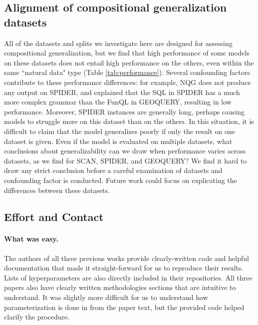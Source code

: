 \subsection{Alignment of compositional generalization datasets}
All of the datasets and splits we investigate here are designed for assessing compositional generalization, but we find that high performance of some models on these datasets does not entail high performance on the others, even within the same ``natural data" type (Table \ref{tab:performance}).
Several confounding factors contribute to these performance differences: for example, NQG does not produce any output on SPIDER, and \cite{shaw-etal-2021-compositional} explained that the SQL in SPIDER has a much more complex grammar than the FunQL in GEOQUERY, resulting in low performance. 
Moreover, SPIDER instances are generally long, perhaps causing models to struggle more on this dataset than on the others.
In this situation, it is difficult to claim that the model generalizes poorly if only the result on one dataset is given.
Even if the model is evaluated on multiple datasets, what conclusions about generalizability can we draw when performance varies across datasets, as we find for SCAN, SPIDER, and GEOQUERY?
We find it hard to draw any strict conclusion before a careful examination of datasets and confounding factor is conducted. Future work could focus on explicating the differences between these datasets.

\subsection{Effort and Contact}
\paragraph{What was easy.}
The authors of all three previous works provide clearly-written code and helpful documentation that made it straight-forward for us to reproduce their results.
Lists of hyperparameters are also directly included in their repositories.
All three papers also have clearly written methodologies sections that are intuitive to understand. 
It was slightly more difficult for us to understand how parameterization is done in \cite{kim2021sequencetosequence} from the paper text, but the provided code helped clarify the procedure.

